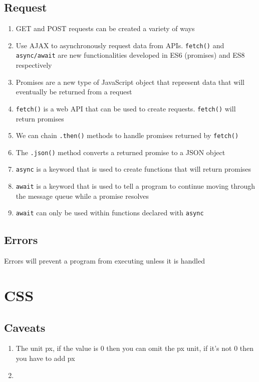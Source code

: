 \documentclass[a4paper, 12pt]{article}
\begin{document}
\subsection{Request}
\begin{enumerate}
\item GET and POST requests can be created a variety of ways
\item Use AJAX to asynchronously request data from APIs. \verb|fetch()| and \verb|async/await| are new functionalities developed in ES6 (promises) and ES8 respectively
\item Promises are a new type of JavaScript object that represent data that will eventually be returned from a request
\item \verb|fetch()| is a web API that can be used to create requests. \verb|fetch()| will return promises
\item We can chain \verb|.then()| methods to handle promises returned by \verb|fetch()|
\item The \verb|.json()| method converts a returned promise to a JSON object
\item \verb|async| is a keyword that is used to create functions that will return promises
\item \verb|await| is a keyword that is used to tell a program to continue moving through the message queue while a promise resolves
\item \verb|await| can only be used within functions declared with \verb|async|
\end{enumerate}

\subsection{Errors}
Errors will prevent a program from executing unless it is handled



\section{CSS}

\subsection{Caveats}
\begin{enumerate}
\item The unit px, if the value is 0 then you can omit the px unit, if it's not 0 then you have to add px

\item 

\end{enumerate}
\end{document}
